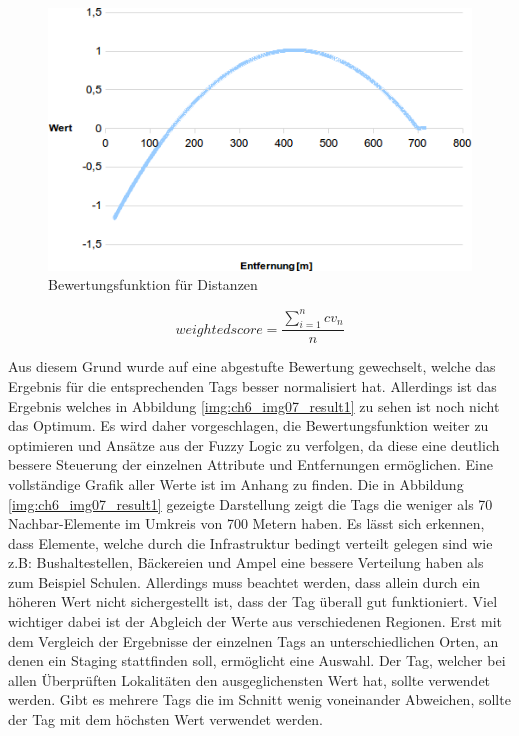 \begin{figure}[H]
\begin{center}
\includegraphics[width=150mm]{images/ch6_img06_valued2.png}
\caption{Bewertungsfunktion für Distanzen}
\label{img:ch6_img06_valued2}
\end{center}
\end{figure}

\begin{equation}
weighted score = \frac{ \sum\limits_{i=1}^n cv_n }{n}
\end{equation}

Aus diesem Grund wurde auf eine abgestufte Bewertung gewechselt, welche das Ergebnis für die entsprechenden Tags besser normalisiert hat.
Allerdings ist das Ergebnis welches in Abbildung \ref{img:ch6_img07_result1} zu sehen ist noch nicht das Optimum. Es wird daher vorgeschlagen, die Bewertungsfunktion weiter zu optimieren und Ansätze aus der Fuzzy Logic zu verfolgen, da diese eine deutlich bessere Steuerung der einzelnen Attribute und Entfernungen ermöglichen. Eine vollständige Grafik aller Werte ist im Anhang zu finden. Die in Abbildung \ref{img:ch6_img07_result1} gezeigte Darstellung zeigt die Tags die weniger als 70 Nachbar-Elemente im Umkreis von 700 Metern haben.
Es lässt sich erkennen, dass Elemente, welche durch die Infrastruktur bedingt verteilt gelegen sind wie z.B: Bushaltestellen, Bäckereien und Ampel eine bessere Verteilung haben als zum Beispiel Schulen. Allerdings muss beachtet werden, dass allein durch ein höheren Wert nicht sichergestellt ist, dass der Tag überall gut funktioniert. Viel wichtiger dabei ist der Abgleich der Werte aus verschiedenen Regionen. Erst mit dem Vergleich der Ergebnisse der einzelnen Tags an unterschiedlichen Orten, an denen ein Staging stattfinden soll, ermöglicht eine Auswahl.
Der Tag, welcher bei allen Überprüften Lokalitäten den ausgeglichensten Wert hat, sollte verwendet werden. Gibt es mehrere Tags die im Schnitt wenig voneinander Abweichen, sollte der Tag mit dem höchsten Wert verwendet werden. 

